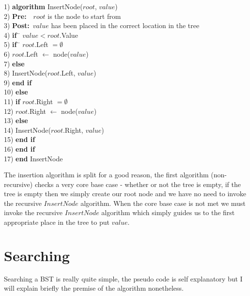 \begin{tabbing}
1)  \textbf{alg}\= \textbf{orithm} InsertNode($root$, $value$) \\
2)  \> \textbf{Pre:}~~$root$ is the node to start from \\
3)  \> \textbf{Post:}~$value$ has been placed in the correct location in the tree \\
4)  \> \textbf{if}~\= $value < root$.Value \\
5)  \> \> \textbf{if}~\= $root$.Left $= \emptyset$ \\
6)  \> \> \> $root$.Left $\leftarrow$ node($value$) \\
7)  \> \> \textbf{else} \\
8)  \> \> \> InsertNode($root$.Left, $value$) \\
9)  \> \> \textbf{end if} \\
10) \> \textbf{else} \\
11) \> \> \textbf{if} $root$.Right $= \emptyset$ \\
12) \> \> \> $root$.Right $\leftarrow$ node($value$) \\
13) \> \> \textbf{else} \\
14) \> \> \> InsertNode($root$.Right, $value$) \\
15) \> \> \textbf{end if} \\
16) \> \textbf{end if} \\
17) \textbf{end} InsertNode \\ 
\end{tabbing}

The insertion algorithm is split for a good reason, the first algorithm (non-recursive) checks a very core base case - whether or not the tree is empty, if the tree is empty then we simply create our root node and we have no need to invoke the recursive $InsertNode$ algorithm. When the core base case is not met we must invoke the recursive $InsertNode$ algorithm which simply guides us to the first appropriate place in the tree to put $value$.

\newpage
\section{Searching}
Searching a BST is really quite simple, the pseudo code is self explanatory but I will explain briefly the premise of the algorithm nonetheless.

